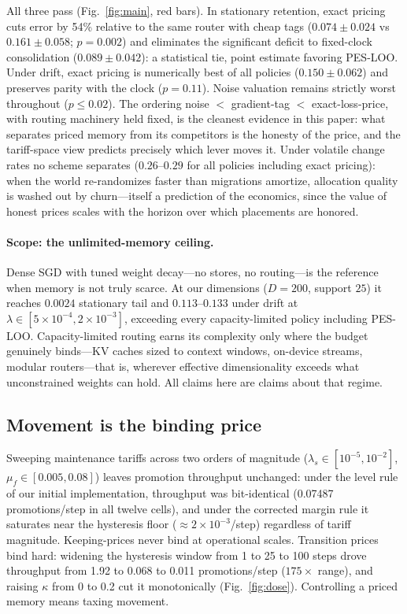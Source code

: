 \documentclass[11pt]{article}
\begin{document}
All three pass (Fig.~\ref{fig:main}, red bars). In stationary retention, exact pricing cuts error by
54\% relative to the same router with cheap tags ($0.074\pm0.024$ vs $0.161\pm0.058$; $p=0.002$) and
eliminates the significant deficit to fixed-clock consolidation ($0.089\pm0.042$): a statistical tie,
point estimate favoring PES-LOO. Under drift, exact pricing is numerically best of all policies
($0.150\pm0.062$) and preserves parity with the clock ($p=0.11$). Noise valuation remains strictly
worst throughout ($p\le 0.02$). The ordering noise $<$ gradient-tag $<$ exact-loss-price, with routing
machinery held fixed, is the cleanest evidence in this paper: what separates priced memory from its
competitors is the honesty of the price, and the tariff-space view predicts precisely which lever moves
it. Under volatile change rates no scheme separates ($0.26$--$0.29$ for all policies including exact
pricing): when the world re-randomizes faster than migrations amortize, allocation quality is washed
out by churn---itself a prediction of the economics, since the value of honest prices scales with the
horizon over which placements are honored.

\paragraph{Scope: the unlimited-memory ceiling.}
Dense SGD with tuned weight decay---no stores, no routing---is the reference when memory is not truly
scarce. At our dimensions ($D{=}200$, support $25$) it reaches $0.0024$ stationary tail and
$0.113$--$0.133$ under drift at $\lambda\in[5{\times}10^{-4},2{\times}10^{-3}]$, exceeding every
capacity-limited policy including PES-LOO. Capacity-limited routing earns its complexity only where the
budget genuinely binds---KV caches sized to context windows, on-device streams, modular routers---that
is, wherever effective dimensionality exceeds what unconstrained weights can hold. All claims here are
claims about that regime.

\subsection{Movement is the binding price}
Sweeping maintenance tariffs across two orders of magnitude ($\lambda_s\in[10^{-5},10^{-2}]$,
$\mu_f\in[0.005,0.08]$) leaves promotion throughput unchanged: under the level rule of our initial
implementation, throughput was bit-identical (0.07487 promotions/step in all twelve cells), and under
the corrected margin rule it saturates near the hysteresis floor ($\approx 2\times10^{-3}$/step)
regardless of tariff magnitude. Keeping-prices never bind at operational scales. Transition prices bind
hard: widening the hysteresis window from 1 to 25 to 100 steps drove throughput from 1.92 to 0.068 to
0.011 promotions/step ($175\times$ range), and raising $\kappa$ from 0 to 0.2 cut it monotonically
(Fig.~\ref{fig:dose}). Controlling a priced memory means taxing movement.
\end{document}
